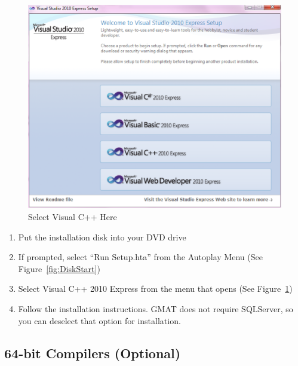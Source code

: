 \documentclass[letterpaper,10pt]{article}%
\begin{document}
\begin{figure}
	\centering
		\includegraphics[scale=0.5]{VisualCpp.eps}
	\caption{Select Visual C++ Here}
	\label{fig:VisualCpp}
\end{figure}

\begin{enumerate}
\item Put the installation disk into your DVD drive
\item If prompted, select ``Run Setup.hta'' from the Autoplay Menu (See Figure~\ref{fig:DiskStart})
\item Select Visual C++ 2010 Express from the menu that opens (See Figure~\ref{fig:VisualCpp})
\item Follow the installation instructions.  GMAT does not require SQLServer, so you can deselect that option for installation.
\end{enumerate}

\subsection{64-bit Compilers (Optional)}
\end{document}
